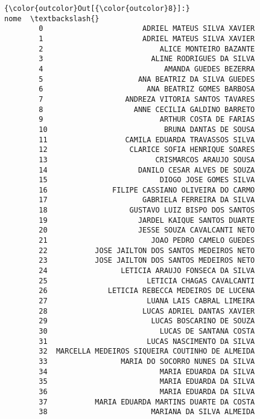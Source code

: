 \documentclass[11pt]{article}
\begin{document}
\begin{Verbatim}[commandchars=\\\{\}]
{\color{outcolor}Out[{\color{outcolor}8}]:}                                               nome  \textbackslash{}
        0                       ADRIEL MATEUS SILVA XAVIER   
        1                       ADRIEL MATEUS SILVA XAVIER   
        2                           ALICE MONTEIRO BAZANTE   
        3                         ALINE RODRIGUES DA SILVA   
        4                            AMANDA GUEDES BEZERRA   
        5                      ANA BEATRIZ DA SILVA GUEDES   
        6                        ANA BEATRIZ GOMES BARBOSA   
        7                   ANDREZA VITORIA SANTOS TAVARES   
        8                     ANNE CECILIA GALDINO BARRETO   
        9                           ARTHUR COSTA DE FARIAS   
        10                           BRUNA DANTAS DE SOUSA   
        11                  CAMILA EDUARDA TRAVASSOS SILVA   
        12                   CLARICE SOFIA HENRIQUE SOARES   
        13                         CRISMARCOS ARAUJO SOUSA   
        14                     DANILO CESAR ALVES DE SOUZA   
        15                          DIOGO JOSE GOMES SILVA   
        16               FILIPE CASSIANO OLIVEIRA DO CARMO   
        17                      GABRIELA FERREIRA DA SILVA   
        18                   GUSTAVO LUIZ BISPO DOS SANTOS   
        19                     JARDEL KAIQUE SANTOS DUARTE   
        20                     JESSE SOUZA CAVALCANTI NETO   
        21                        JOAO PEDRO CAMELO GUEDES   
        22           JOSE JAILTON DOS SANTOS MEDEIROS NETO   
        23           JOSE JAILTON DOS SANTOS MEDEIROS NETO   
        24                 LETICIA ARAUJO FONSECA DA SILVA   
        25                       LETICIA CHAGAS CAVALCANTI   
        26              LETICIA REBECCA MEDEIROS DE LUCENA   
        27                       LUANA LAIS CABRAL LIMEIRA   
        28                      LUCAS ADRIEL DANTAS XAVIER   
        29                        LUCAS BOSCARINO DE SOUZA   
        30                          LUCAS DE SANTANA COSTA   
        31                       LUCAS NASCIMENTO DA SILVA   
        32  MARCELLA MEDEIROS SIQUEIRA COUTINHO DE ALMEIDA   
        33                 MARIA DO SOCORRO NUNES DA SILVA   
        34                          MARIA EDUARDA DA SILVA   
        35                          MARIA EDUARDA DA SILVA   
        36                          MARIA EDUARDA DA SILVA   
        37           MARIA EDUARDA MARTINS DUARTE DA COSTA   
        38                        MARIANA DA SILVA ALMEIDA   

\end{Verbatim}
\end{document}
